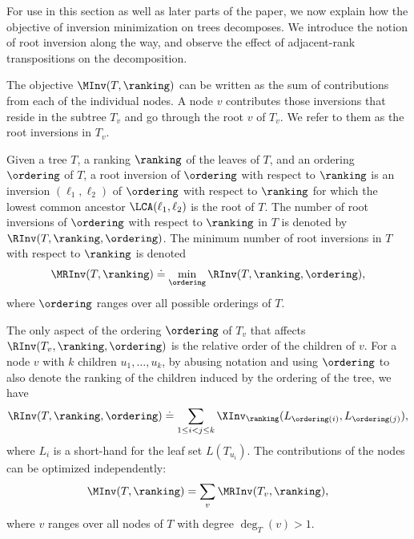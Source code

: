 \documentclass{toc}
\begin{document}
For use in this section as well as later parts of the paper, we now explain how the objective of inversion minimization on trees decomposes. We introduce the notion of root inversion along the way, and observe the effect of adjacent-rank transpositions on the decomposition.

The objective $\MInv(T,\ranking)$ can be written as the sum of contributions from each of the individual nodes. A node $v$ contributes those inversions that reside in the subtree $T_v$ and go through the root $v$ of $T_v$. We refer to them as the root inversions in $T_v$. 
\begin{definition}
Given a tree $T$, a ranking $\ranking$ of the leaves of $T$, and an ordering $\ordering$ of $T$, a root inversion of $\ordering$ with respect to $\ranking$ is an inversion $(\ell_1,\ell_2)$ of $\ordering$ with respect to $\ranking$ for which the lowest common ancestor $\LCA(\ell_1,\ell_2)$ is the root of $T$. The number of root inversions of $\ordering$ with respect to $\ranking$ in $T$ is denoted by $\RInv(T,\ranking,\ordering)$. The minimum number of root inversions in $T$ with respect to $\ranking$ is denoted 
\begin{equation}\label{eq:MRInv}
\MRInv(T,\ranking) \doteq \min_\ordering \RInv(T,\ranking,\ordering),
\end{equation}
where $\ordering$ ranges over all possible orderings of $T$.
\end{definition}
The only aspect of the ordering $\ordering$ of $T_v$ that affects $\RInv(T_v,\ranking,\ordering)$ is the relative order of the children of $v$. For a node $v$ with $k$ children $u_1,\dots,u_k$, by abusing notation and using $\ordering$ to also denote the ranking of the children induced by the ordering of the tree, we have
\begin{equation}\label{eq:cost}
\RInv(T,\ranking,\ordering) \doteq \sum_{1 \le i < j \le k} \XInv_\ranking(L_{\ordering(i)},L_{\ordering(j)}),
\end{equation}
where $L_i$ is a short-hand for the leaf set $L(T_{u_i})$. The contributions of the nodes can be optimized independently:
\begin{equation}\label{eq:MInv:decomposition}
\MInv(T,\ranking) = \sum_v \MRInv(T_v,\ranking),
\end{equation}
where $v$ ranges over all nodes of $T$ with degree $\deg_T(v)>1$. 
\end{document}
